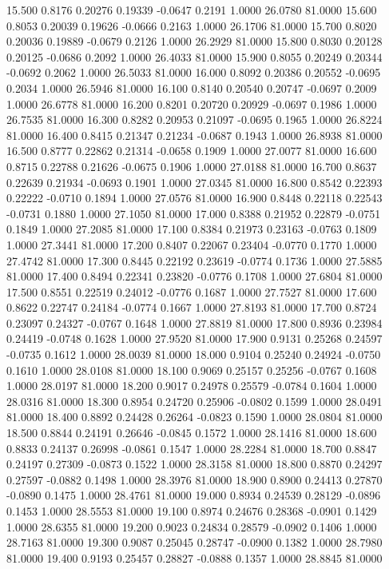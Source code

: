   15.500   0.8176   0.20276   0.19339  -0.0647   0.2191   1.0000  26.0780  81.0000
  15.600   0.8053   0.20039   0.19626  -0.0666   0.2163   1.0000  26.1706  81.0000
  15.700   0.8020   0.20036   0.19889  -0.0679   0.2126   1.0000  26.2929  81.0000
  15.800   0.8030   0.20128   0.20125  -0.0686   0.2092   1.0000  26.4033  81.0000
  15.900   0.8055   0.20249   0.20344  -0.0692   0.2062   1.0000  26.5033  81.0000
  16.000   0.8092   0.20386   0.20552  -0.0695   0.2034   1.0000  26.5946  81.0000
  16.100   0.8140   0.20540   0.20747  -0.0697   0.2009   1.0000  26.6778  81.0000
  16.200   0.8201   0.20720   0.20929  -0.0697   0.1986   1.0000  26.7535  81.0000
  16.300   0.8282   0.20953   0.21097  -0.0695   0.1965   1.0000  26.8224  81.0000
  16.400   0.8415   0.21347   0.21234  -0.0687   0.1943   1.0000  26.8938  81.0000
  16.500   0.8777   0.22862   0.21314  -0.0658   0.1909   1.0000  27.0077  81.0000
  16.600   0.8715   0.22788   0.21626  -0.0675   0.1906   1.0000  27.0188  81.0000
  16.700   0.8637   0.22639   0.21934  -0.0693   0.1901   1.0000  27.0345  81.0000
  16.800   0.8542   0.22393   0.22222  -0.0710   0.1894   1.0000  27.0576  81.0000
  16.900   0.8448   0.22118   0.22543  -0.0731   0.1880   1.0000  27.1050  81.0000
  17.000   0.8388   0.21952   0.22879  -0.0751   0.1849   1.0000  27.2085  81.0000
  17.100   0.8384   0.21973   0.23163  -0.0763   0.1809   1.0000  27.3441  81.0000
  17.200   0.8407   0.22067   0.23404  -0.0770   0.1770   1.0000  27.4742  81.0000
  17.300   0.8445   0.22192   0.23619  -0.0774   0.1736   1.0000  27.5885  81.0000
  17.400   0.8494   0.22341   0.23820  -0.0776   0.1708   1.0000  27.6804  81.0000
  17.500   0.8551   0.22519   0.24012  -0.0776   0.1687   1.0000  27.7527  81.0000
  17.600   0.8622   0.22747   0.24184  -0.0774   0.1667   1.0000  27.8193  81.0000
  17.700   0.8724   0.23097   0.24327  -0.0767   0.1648   1.0000  27.8819  81.0000
  17.800   0.8936   0.23984   0.24419  -0.0748   0.1628   1.0000  27.9520  81.0000
  17.900   0.9131   0.25268   0.24597  -0.0735   0.1612   1.0000  28.0039  81.0000
  18.000   0.9104   0.25240   0.24924  -0.0750   0.1610   1.0000  28.0108  81.0000
  18.100   0.9069   0.25157   0.25256  -0.0767   0.1608   1.0000  28.0197  81.0000
  18.200   0.9017   0.24978   0.25579  -0.0784   0.1604   1.0000  28.0316  81.0000
  18.300   0.8954   0.24720   0.25906  -0.0802   0.1599   1.0000  28.0491  81.0000
  18.400   0.8892   0.24428   0.26264  -0.0823   0.1590   1.0000  28.0804  81.0000
  18.500   0.8844   0.24191   0.26646  -0.0845   0.1572   1.0000  28.1416  81.0000
  18.600   0.8833   0.24137   0.26998  -0.0861   0.1547   1.0000  28.2284  81.0000
  18.700   0.8847   0.24197   0.27309  -0.0873   0.1522   1.0000  28.3158  81.0000
  18.800   0.8870   0.24297   0.27597  -0.0882   0.1498   1.0000  28.3976  81.0000
  18.900   0.8900   0.24413   0.27870  -0.0890   0.1475   1.0000  28.4761  81.0000
  19.000   0.8934   0.24539   0.28129  -0.0896   0.1453   1.0000  28.5553  81.0000
  19.100   0.8974   0.24676   0.28368  -0.0901   0.1429   1.0000  28.6355  81.0000
  19.200   0.9023   0.24834   0.28579  -0.0902   0.1406   1.0000  28.7163  81.0000
  19.300   0.9087   0.25045   0.28747  -0.0900   0.1382   1.0000  28.7980  81.0000
  19.400   0.9193   0.25457   0.28827  -0.0888   0.1357   1.0000  28.8845  81.0000
